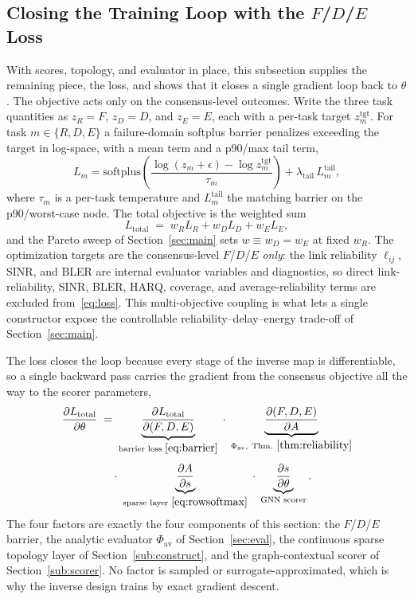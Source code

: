 \documentclass[journal]{IEEEtran}
\begin{document}
\subsection{Closing the Training Loop with the $F$/$D$/$E$ Loss}\label{sub:loss}

With scores, topology, and evaluator in place, this subsection supplies the
remaining piece, the loss, and shows that it closes a single gradient loop back
to $\theta$. The objective acts only on the consensus-level outcomes. Write the
three task
quantities as $z_R=F$, $z_D=D$, and $z_E=E$, each with a per-task target
$z_m^{\mathrm{tgt}}$. For task $m\in\{R,D,E\}$ a failure-domain softplus barrier
penalizes exceeding the target in log-space, with a mean term and a p90/max tail
term,
\begin{equation}
  L_m = \mathrm{softplus}\!\left(
  \frac{\log(z_m+\epsilon)-\log z_m^{\mathrm{tgt}}}{\tau_m}\right)
  + \lambda_{\mathrm{tail}}\,L_m^{\mathrm{tail}},
  \label{eq:barrier}
\end{equation}
where $\tau_m$ is a per-task temperature and $L_m^{\mathrm{tail}}$ the matching
barrier on the p90/worst-case node. The total objective is the weighted sum
\begin{equation}
  L_{\mathrm{total}} \;=\; w_R L_R + w_D L_D + w_E L_E,
  \label{eq:loss}
\end{equation}
and the Pareto sweep of Section~\ref{sec:main} sets $w\equiv w_D=w_E$ at fixed
$w_R$. The optimization targets are the consensus-level $F$/$D$/$E$ \emph{only}:
the link reliability $\ell_{ij}$, SINR, and BLER are internal evaluator variables
and diagnostics, so direct link-reliability, SINR, BLER, HARQ, coverage, and
average-reliability terms are excluded from~\eqref{eq:loss}. This multi-objective
coupling is what lets a single constructor expose the controllable
reliability--delay--energy trade-off of Section~\ref{sec:main}.

The loss closes the loop because every stage of the inverse map is
differentiable, so a single backward pass carries the gradient from the
consensus objective all the way to the scorer parameters,
\begin{equation}
  \begin{aligned}
  \frac{\partial L_{\mathrm{total}}}{\partial \theta}
  &\;=\;
  \underbrace{\frac{\partial L_{\mathrm{total}}}{\partial (F,D,E)}}_{\text{barrier loss }\eqref{eq:barrier}}
  \;\cdot\;
  \underbrace{\frac{\partial (F,D,E)}{\partial A}}_{\Phi_{\mathrm{av}},\ \text{Thm.}~\ref{thm:reliability}}
  \\[4pt]
  &\quad\;\cdot\;
  \underbrace{\frac{\partial A}{\partial s}}_{\text{sparse layer }\eqref{eq:rowsoftmax}}
  \;\cdot\;
  \underbrace{\frac{\partial s}{\partial \theta}}_{\text{GNN scorer}}.
  \end{aligned}
  \label{eq:gradpath}
\end{equation}
The four factors are exactly the four components of this section: the $F$/$D$/$E$
barrier, the analytic evaluator $\Phi_{\mathrm{av}}$ of Section~\ref{sec:eval},
the continuous sparse topology layer of Section~\ref{sub:construct}, and the
graph-contextual scorer of Section~\ref{sub:scorer}. No factor is sampled or
surrogate-approximated, which is why the inverse design trains by exact gradient
descent.
\end{document}
